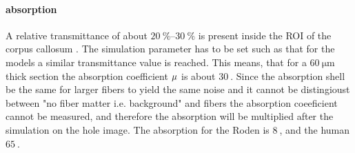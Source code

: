\paragraph{absorption}
% 
A relative transmittance of about $\SIrange{20}{30}{\percent}$ is present inside the \ac{ROI} of the corpus callosum . 
The simulation parameter has to be set such as that for the models a similar transmittance value is reached.
This means, that for a $\SI{60}{\micro\meter}$ thick section the absorption coefficient $\textnormal{$\mu$}{}$ is about $\SI{30}{}$. 
Since the absorption shell be the same for larger fibers to yield the same noise and it cannot be distingioust between "no fiber matter i.e. background" and fibers the absorption coeeficient cannot be measured, and therefore the absorption will be multiplied after the simulation on the hole image. The absorption for the Roden is $\SI{8}{}$, and the human $\SI{65}{}$.

% 

% 
%
% 
